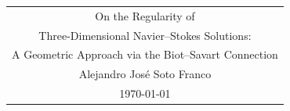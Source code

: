 \documentclass[11pt,a4paper,openany]{book}
\begin{document}
\frontmatter

\begin{titlepage}
  \null\vfill
  \begin{center}
  \begin{tabular}{@{}c@{}}
    {\LARGE On the Regularity of} \\[6pt]
    {\LARGE Three-Dimensional Navier--Stokes Solutions:} \\[6pt]
    {\LARGE A Geometric Approach via the Biot--Savart Connection} \\[24pt]
    {\large Alejandro Jos\'e Soto Franco} \\[12pt]
    {\large \today}
  \end{tabular}
  \end{center}
  \vfill\vfill\null
\end{titlepage}
\tableofcontents


\let\origcleardoublepage\cleardoublepage
\let\cleardoublepage\clearpage
\mainmatter
\let\cleardoublepage\origcleardoublepage









\appendix





\backmatter
\printbibliography
\end{document}
